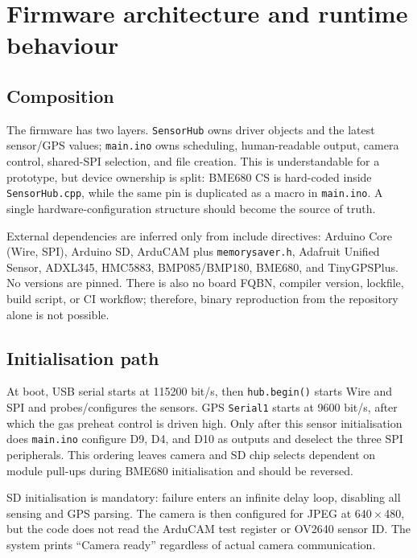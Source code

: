 \documentclass[11pt,a4paper]{article}
\newcommand{\code}[1]{\texttt{#1}}
\begin{document}
\section{Firmware architecture and runtime behaviour}

\subsection{Composition}

The firmware has two layers. \code{SensorHub} owns driver objects and the latest sensor/GPS values; \code{main.ino} owns scheduling, human-readable output, camera control, shared-SPI selection, and file creation. This is understandable for a prototype, but device ownership is split: BME680 CS is hard-coded inside \code{SensorHub.cpp}, while the same pin is duplicated as a macro in \code{main.ino}. A single hardware-configuration structure should become the source of truth.

External dependencies are inferred only from include directives: Arduino Core (Wire, SPI), Arduino SD, ArduCAM plus \code{memorysaver.h}, Adafruit Unified Sensor, ADXL345, HMC5883, BMP085/BMP180, BME680, and TinyGPSPlus. No versions are pinned. There is also no board FQBN, compiler version, lockfile, build script, or CI workflow; therefore, binary reproduction from the repository alone is not possible.

\subsection{Initialisation path}

At boot, USB serial starts at 115200 bit/s, then \code{hub.begin()} starts Wire and SPI and probes/configures the sensors. GPS \code{Serial1} starts at 9600 bit/s, after which the gas preheat control is driven high. Only after this sensor initialisation does \code{main.ino} configure D9, D4, and D10 as outputs and deselect the three SPI peripherals. This ordering leaves camera and SD chip selects dependent on module pull-ups during BME680 initialisation and should be reversed.

SD initialisation is mandatory: failure enters an infinite delay loop, disabling all sensing and GPS parsing. The camera is then configured for JPEG at 640\,$\times$\,480, but the code does not read the ArduCAM test register or OV2640 sensor ID. The system prints ``Camera ready'' regardless of actual camera communication.
\end{document}
